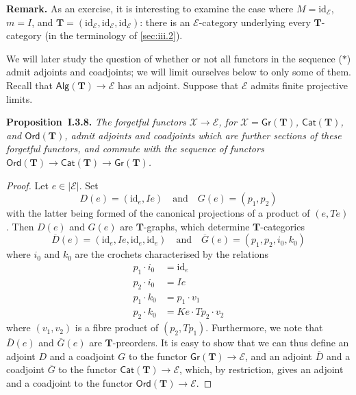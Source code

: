 \documentclass[fleqn]{article}
\newenvironment{itenv}[1]
  {\phantomsection\par\medskip\noindent\textbf{#1.}\itshape}
  {\par\medskip}
\newenvironment{rmenv}[1]
  {\phantomsection\par\medskip\noindent\textbf{#1.}\rmfamily}
  {\par\medskip}
\newcommand{\id}{\mathrm{id}}
\newcommand{\TT}{\mathbf{T}}
\newcommand{\textand}{\quad\text{and}\quad}
\newcommand{\cat}[1]{\mathcal{#1}}
\newcommand{\Cat}[1]{\mathsf{#1}}
\newcommand{\set}[1]{|#1|}
\newcommand{\Gr}[1]{\Cat{Gr}(#1)}
\newcommand{\Alg}[1]{\Cat{Alg}(#1)}
\newcommand{\Ord}[1]{\Cat{Ord}(#1)}
\begin{document}
\begin{rmenv}{Remark}
  As an exercise, it is interesting to examine the case where $M=\id_\cat{E}$, $m=I$, and $\TT=(\id_\cat{E},\id_\cat{E},\id_\cat{E})$: there is an $\cat{E}$-category underlying every $\TT$-category (in the terminology of \cref{sec:iii.2}).
\end{rmenv}

We will later study the question of whether or not all functors in the sequence ($\ast$) admit adjoints and coadjoints;
we will limit ourselves below to only some of them.
Recall that $\Alg{\TT}\to\cat{E}$ has an adjoint.
Suppose that $\cat{E}$ admits finite projective limits.

\begin{itenv}{Proposition~I.3.8}
  The forgetful functors $\cat{X}\to\cat{E}$, for $\cat{X}=\Gr{\TT}$, $\Cat{Cat}(\TT)$, and $\Ord{\TT}$, admit adjoints and coadjoints which are further sections of these forgetful functors, and commute with the sequence of functors $\Ord{\TT}\to\Cat{Cat}(\TT)\to\Gr{\TT}$.
\end{itenv}

\begin{proof}
  Let $e\in\set{\cat{E}}$.
  Set
  \[
    D(e) = (\id_e,Ie)
    \textand
    G(e) = (p_1,p_2)
  \]
  with the latter being formed of the canonical projections of a product of $(e,Te)$.
  Then $D(e)$ and $G(e)$ are $\TT$-graphs, which determine $\TT$-categories
  \[
    \overline{D}(e) = (\id_e,Ie,\id_e,\id_e)
    \textand
    \overline{G}(e) = (p_1,p_2,i_0,k_0)
  \]
  where $i_0$ and $k_0$ are the crochets characterised by the relations
  \[
    \begin{aligned}
      p_1\cdot i_0
    & = \id_e
    \\p_2\cdot i_0
    & = Ie
    \\p_1\cdot k_0
    & = p_1\cdot v_1
    \\p_2\cdot k_0
    & = Ke\cdot Tp_2\cdot v_2
    \end{aligned}
  \]
  where $(v_1,v_2)$ is a fibre product of $(p_2,Tp_1)$.
  Furthermore, we note that $\overline{D}(e)$ and $\overline{G}(e)$ are $\TT$-preorders.
  It is easy to show that we can thus define an adjoint $D$ and a coadjoint $G$ to the functor $\Gr{\TT}\to\cat{E}$, and an adjoint $\overline{D}$ and a coadjoint $\overline{G}$ to the functor $\Cat{Cat}(\TT)\to\cat{E}$, which, by restriction, gives an adjoint and a coadjoint to the functor $\Ord{\TT}\to\cat{E}$.
\end{proof}
\end{document}
